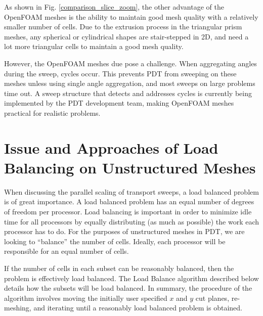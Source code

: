 \documentclass[11pt, letterpaper,titlepage,oneside]{article}
\begin{document}
As shown in Fig. \ref{comparison_slice_zoom}, the other advantage of the OpenFOAM meshes is the ability to maintain good mesh quality with a relatively smaller number of cells. Due to the extrusion process in the triangular prism meshes, any spherical or cylindrical shapes are stair-stepped in 2D, and need a lot more triangular cells to maintain a good mesh quality.

However, the OpenFOAM meshes due pose a challenge. When aggregating angles during the sweep, cycles occur. This prevents PDT from sweeping on these meshes unless using single angle aggregation, and most sweeps on large problems time out. A sweep structure that detects and addresses cycles is currently being implemented by the PDT development team, making OpenFOAM meshes practical for realistic problems.

\section{Issue and Approaches of Load Balancing on Unstructured Meshes}

When discussing the parallel scaling of transport sweeps, a load balanced problem is of great importance. A load balanced problem has an equal number of degrees of freedom per processor. Load balancing is important in order to minimize idle time for all processors by equally distributing (as much as possible) the work each processor has to do.  For the purposes of unstructured meshes in PDT, we are looking to ``balance'' the number of cells. Ideally, each processor will be responsible for an equal number of cells. 

If the number of cells in each subset can be reasonably balanced, then the problem is effectively load balanced. The Load Balance algorithm described below details how the subsets will be load balanced. In summary, the procedure of the algorithm involves moving the initially user specified $x$ and $y$ cut planes, re-meshing, and iterating until a reasonably load balanced problem is obtained. 
\end{document}
